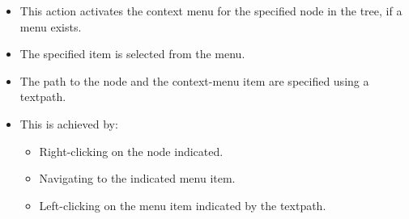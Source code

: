\begin{itemize}
\item This action activates the context menu for the specified node in the tree, if a menu exists.
\item The specified item is  selected from the menu.
\item The path to the node and the context-menu item are specified using a textpath.
\item This is achieved by:
  \begin{itemize}
    \item Right-clicking on the node indicated.
    \item Navigating to the indicated menu item.
    \item Left-clicking on the menu item indicated by the textpath.
  \end{itemize}
\end{itemize}
 